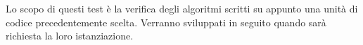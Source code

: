 Lo scopo di questi test è la verifica degli algoritmi scritti su appunto una unità di codice precedentemente scelta. Verranno sviluppati in seguito quando sarà richiesta la loro istanziazione.